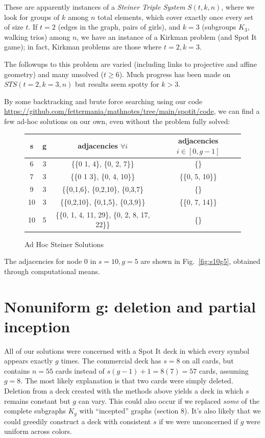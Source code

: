 \documentclass[11pt, oneside]{article} 	%
\begin{document}
These are apparently instances of a \emph{Steiner Triple System} $S(t, k, n)$\cite{6}, where we look for groups of $k$ among $n$ total elements, which cover exactly once every set of size $t$. If $t=2$ (edges in the graph, pairs of girls), and $k=3$ (subgroups $K_3$, walking trios) among $n$, we have an instance of a Kirkman problem (and Spot It game); in fact, Kirkman problems are those where $t=2, k=3$.

The followups to this problem are varied (including links to projective and affine geometry) and many unsolved ($t \geq 6$). Much progress has been made on $STS(t=2,k=3,n)$ but results seem spotty for $k>3$.

By some backtracking and brute force searching using our code \url{https://github.com/fettermania/mathnotes/tree/main/spotit/code}, we can find a few ad-hoc solutions on our own, even without the problem fully solved:



\begin{figure}[!htb]
\centering
 \centering
 \begin{tabular}{c c | c | c }
 s & g & adjacencies $\forall i$ & adjacencies $i \in [0, g-1]$ \\
\hline
 6 & 3 & \{\{0 1, 4\}, \{0, 2, 7\}\} & \{\}\\
 7 & 3 & \{\{0 1 3\}, \{0, 4, 10\}\} & \{\{0, 5, 10\}\} \\
 9 & 3 & \{\{0,1,6\}, \{0,2,10\}, \{0,3,7\} & \{\} \\
 10 & 3 & \{\{0,2,10\}, \{0,1,5\}, \{0,3,9\}\} & \{\{0, 7, 14\}\} \\
 10 & 5 & \{\{0, 1, 4, 11, 29\}, \{0, 2, 8, 17, 22\}\} & \{\} \\
 \end{tabular}
 \caption{Ad Hoc Steiner Solutions }
\label{fig:ad-hoc-steiner}
\end{figure}

The adjacencies for node 0 in $s=10, g=5$ are shown in Fig.~\ref{fig:s10g5}, obtained through computational means.

\section{Nonuniform g: deletion and partial inception}

All of our solutions were concerned with a Spot It deck in which every symbol appears exactly $g$ times. The commercial deck has $s=8$ on all cards, but contains $n=55$ cards instead of $s(g-1) +1 = 8(7) = 57$ cards, assuming $g=8$. The most likely explanation is that two cards were simply deleted. Deletion from a deck created with the methods above yields a deck in which $s$ remains constant but $g$ can vary. This could also occur if we replaced \emph{some} of the complete subgraphs $K_g$ with ``incepted'' graphs (section 8). It's also likely that we could greedily construct a deck with consistent $s$ if we were unconcerned if $g$ were uniform across colors.
\end{document}
